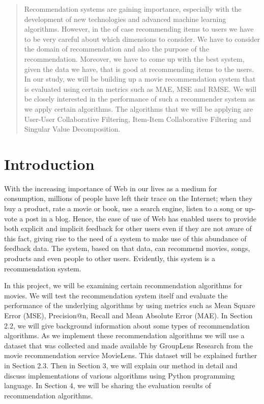 \documentclass[12pt,a4paper]{report}
\begin{document}
\begin{abstract}
Recommendation systems are gaining importance, especially with the development of new technologies and advanced machine learning algorithms. However, in the of case recommending items to users we have to be very careful about which dimensions to consider. We have to consider the domain of recommendation and also the purpose of the recommendation. Moreover, we have to come up with the best system, given the data we have, that is good at recommending items to the users. In our study, we will be building up a movie recommendation system that is evaluated using certain metrics such as MAE, MSE and RMSE. We will be closely interested in the performance of such a recommender system as we apply certain algorithms. The algorithms that we will be applying are User-User Collaborative Filtering, Item-Item Collaborative Filtering and Singular Value Decomposition.
\end{abstract}

\tableofcontents

\chapter{Introduction}


With the increasing importance of Web in our lives as a medium for consumption, millions of people have left their trace on the Internet; when they buy a product, rate a movie or book, use a search engine, listen to a song or up-vote a post in a blog. Hence, the ease of use of Web has enabled users to provide both explicit and implicit feedback for other users even if they are not aware of this fact, giving rise to the need of a system to make use of this abundance of feedback data. The system, based on that data, can recommend movies, songs, products and even people to other users. Evidently, this system is a recommendation system. 

In this project, we will be examining certain recommendation algorithms for movies. We will test the recommendation system itself and evaluate the performance of the underlying algorithms by using metrics such as Mean Square Error (MSE), Precision@n, Recall and Mean Absolute Error (MAE). In Section 2.2, we will give background information about some types of recommendation algorithms. As we implement these recommendation algorithms we will use a dataset that was collected and made available by GroupLens Research from the movie recommendation service MovieLens. This dataset will be explained further in Section 2.3. Then in Section 3, we will explain our method in detail and discuss implementations of various algorithms using Python programming language. In Section 4, we will be sharing the evaluation results of recommendation algorithms.
  
\end{document}
